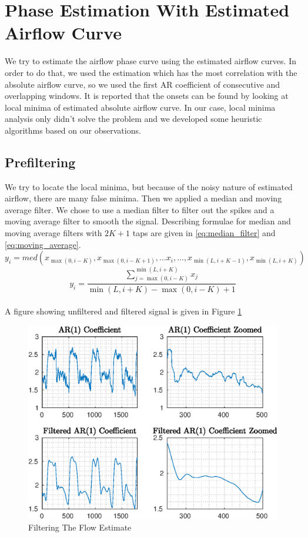 \section{Phase Estimation With Estimated Airflow Curve}
We try to estimate the airflow phase curve using the estimated airflow curves. In order to do that, we used the estimation which has the most correlation with the absolute airflow curve, so we used the first AR coefficient of consecutive and overlapping windows. It is reported that the onsets can be found by looking at local minima of estimated absolute airflow curve. In our case, local minima analysis only didn't solve the problem and we developed some heuristic algorithms based on our observations.
\subsection{Prefiltering}
We try to locate the local minima, but because of the noisy nature of estimated airflow, there are many false minima. Then we applied a median and moving average filter. We chose to use a median filter to filter out the spikes and a moving average filter to smooth the signal. Describing formulae for median and moving average filters with $2K+1$ taps are given in \eqref{eq:median_filter} and \eqref{eq:moving_average}.
\begin{equation}
	y_i = med(x_{\max(0,{i-K})}, x_{\max(0,{i-K+1})}, ... x_i, ..., x_{\min(L,{i+K-1})}, x_{\min(L,{i+K})})
	\label{eq:median_filter}
\end{equation}
\begin{equation}
y_i = \frac{\sum_{j=\max(0, i-K)}^{\min(L, i+K)}x_j}{\min(L, i+K) - \max(0, i-K) + 1}
\label{eq:moving_average}
\end{equation}
\paragraph{}A figure showing unfiltered and filtered signal is given in Figure \ref{fig:prefiltering}
\begin{figure}[h!]
	\begin{center}
		\includegraphics[width=\textwidth]{figures/prefiltering.eps}
		\caption{Filtering The Flow Estimate}
		\label{fig:prefiltering}
	\end{center}
\end{figure}
